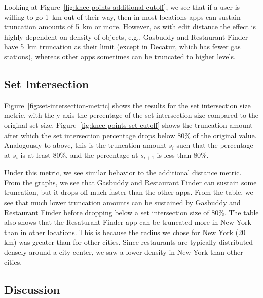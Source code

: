 \documentclass[10pt, conference, compsocconf]{IEEEtran}
\begin{document}
{Looking at Figure~\ref{fig:knee-points-additional-cutoff}, we see that
if a user is willing to go 1~km out of their way, then in most
locations apps can sustain truncation amounts of 5~km or
more. However, as with edit distance the effect is highly dependent on
density of objects, e.g., Gasbuddy and Restaurant Finder have 5~km
truncation as their limit (except in Decatur, which has fewer gas
stations), whereas other apps sometimes can be truncated to higher levels.

\subsection{Set Intersection}

Figure~\ref{fig:set-intersection-metric} shows the results for the set
intersection size metric, with the y-axis the percentage of the set
intersection size compared to the original set size.
Figure~\ref{fig:knee-points-set-cutoff} shows the truncation amount
after which the set intersection percentage drops below 80\% of the
original value. Analogously to above, this is the truncation amount
$s_i$ such that the percentage at $s_i$ is at least 80\%, and the
percentage at $s_{i+1}$ is less than 80\%.

Under this metric, we see similar behavior to the additional distance
metric. From the graphs, we see that Gasbuddy and Restaurant Finder
can sustain some truncation, but it drops off much faster than the
other apps. From the table, we see that much lower truncation amounts
can be sustained by Gasbuddy and Restaurant Finder before dropping
below a set intersection size of 80\%.
The table also shows that the Resaturant Finder app can be truncated 
more in New York than in other locations.  This is because the radius
we chose for New York (20 km) was greater than for other cities.  
Since restaurants are typically distributed densely around a city center,
we saw a lower density in New York than other cities.


\subsection{Discussion}

}
\end{document}
